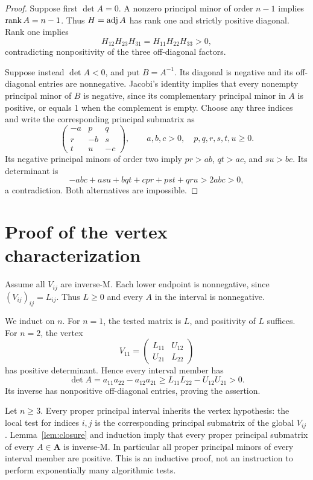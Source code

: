 \begin{proof}
Suppose first $\det A=0$. A nonzero principal minor of order $n-1$ implies $\operatorname{rank} A=n-1$. Thus $H=\operatorname{adj} A$ has rank one and strictly positive diagonal. Rank one implies
\[
 H_{12}H_{23}H_{31}=H_{11}H_{22}H_{33}>0,
\]
contradicting nonpositivity of the three off-diagonal factors.

Suppose instead $\det A<0$, and put $B=A^{-1}$. Its diagonal is negative and its off-diagonal entries are nonnegative. Jacobi's identity implies that every nonempty principal minor of $B$ is negative, since its complementary principal minor in $A$ is positive, or equals 1 when the complement is empty. Choose any three indices and write the corresponding principal submatrix as
\[
 \begin{pmatrix}-a&p&q\\r&-b&s\\t&u&-c\end{pmatrix},
 \qquad a,b,c>0,\quad p,q,r,s,t,u\ge0.
\]
Its negative principal minors of order two imply $pr>ab$, $qt>ac$, and $su>bc$. Its determinant is
\[
 -abc+a su+bqt+cpr+pst+qru>2abc>0,
\]
a contradiction. Both alternatives are impossible.
\end{proof}
\section{Proof of the vertex characterization}
Assume all $V_{ij}$ are inverse-M. Each lower endpoint is nonnegative, since $(V_{ij})_{ij}=L_{ij}$. Thus $L\ge0$ and every $A$ in the interval is nonnegative.

We induct on $n$. For $n=1$, the tested matrix is $L$, and positivity of $L$ suffices. For $n=2$, the vertex
\[
 V_{11}=\begin{pmatrix}L_{11}&U_{12}\\U_{21}&L_{22}\end{pmatrix}
\]
has positive determinant. Hence every interval member has
\[
 \det A=a_{11}a_{22}-a_{12}a_{21}
 \ge L_{11}L_{22}-U_{12}U_{21}>0.
\]
Its inverse has nonpositive off-diagonal entries, proving the assertion.

Let $n\ge3$. Every proper principal interval inherits the vertex hypothesis: the local test for indices $i,j$ is the corresponding principal submatrix of the global $V_{ij}$. Lemma~\ref{lem:closure} and induction imply that every proper principal submatrix of every $A\in\boldsymbol A$ is inverse-M. In particular all proper principal minors of every interval member are positive. This is an inductive proof, not an instruction to perform exponentially many algorithmic tests.

